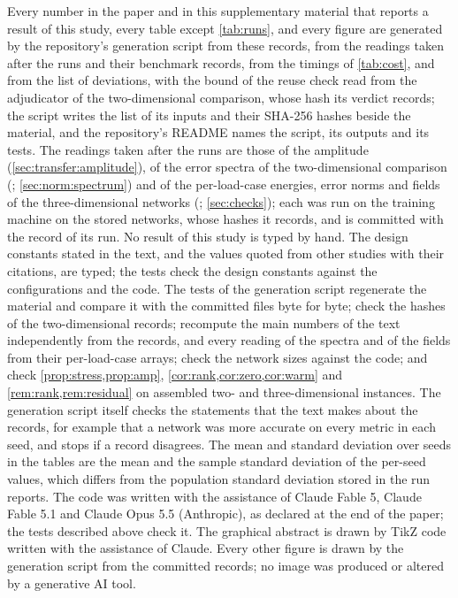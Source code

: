 Every number in the paper and in this supplementary material that reports a result of this
study, every table except \cref{tab:runs}, and every figure are generated by
the repository's generation script from these records, from the readings taken after the
runs and their benchmark records, from the timings of \cref{tab:cost}, and from the list of
deviations, with the bound of the reuse check read from the adjudicator of the
two-dimensional comparison, whose hash its verdict records; the script writes the list of
its inputs and their SHA-256 hashes beside the material, and the repository's README names
the script, its outputs and its tests. The readings taken after the runs are those of the
amplitude (\cref{sec:transfer:amplitude}), of the error spectra of the two-dimensional
comparison (; \cref{sec:norm:spectrum}) and of the
per-load-case energies, error norms and fields of the three-dimensional networks
(; \cref{sec:checks}); each was run on the training
machine on the stored networks, whose hashes it records, and is committed with the record of
its run. No result of this study is typed by hand. The design constants stated in the text,
and the values quoted from other studies with their citations, are typed; the tests check
the design constants against the configurations and the code. The tests of the generation
script regenerate the material and compare it with the committed files byte for byte; check
the hashes of the two-dimensional records; recompute the main numbers of the text
independently from the records, and every reading of the spectra and of the fields from
their per-load-case arrays; check the network sizes against the code; and check
\cref{prop:stress,prop:amp}, \cref{cor:rank,cor:zero,cor:warm} and
\cref{rem:rank,rem:residual} on assembled two- and three-dimensional instances. The
generation script itself checks the statements that the text makes about the records, for
example that a network was more accurate on every metric in each seed, and stops if a record
disagrees. The mean and standard deviation over seeds in the tables are the mean and the
sample standard deviation of the per-seed values, which differs from the population standard
deviation stored in the run reports. The code was written with the assistance of Claude
Fable 5, Claude Fable 5.1 and Claude Opus 5.5 (Anthropic), as declared at the end of the
paper; the tests described above check it. The graphical abstract is drawn by TikZ code
written with the assistance of Claude. Every other
figure is drawn by the generation script from the committed records; no image was produced
or altered by a generative AI tool.

